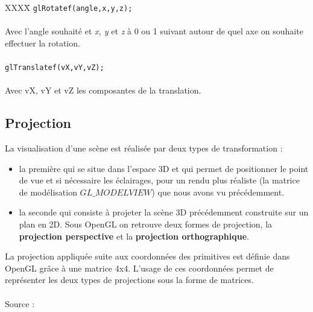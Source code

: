 \begin{tabbing}
XXXX\= \kill
\> \verb|glRotatef(angle,x,y,z);| \\\\
Avec l'angle souhaité et \textit{x, y} et \textit{z} à 0 ou 1 suivant autour de quel axe on souhaite\\ effectuer la rotation.\\\\
\> \verb|glTranslatef(vX,vY,vZ);|\\\\
Avec vX, vY et vZ les composantes de la translation. 
\end{tabbing}

\subsection{Projection}

La visualisation d'une scène est réalisée par deux types de transformation :

\begin{itemize}
	\item la première qui se situe dans l'espace 3D et qui permet de positionner le point de vue et si nécessaire les éclairages, pour un rendu plus réaliste (la matrice de modélisation $GL\_MODELVIEW$) que nous avons vu précédemment.

	\item la seconde qui consiste à projeter la scène 3D précédemment construite sur un plan en 2D. Sous OpenGL on retrouve deux formes de projection, la \textbf{projection perspective} et la \textbf{projection orthographique}.
\end{itemize}

La projection appliquée suite aux coordonnées des primitives est définie dans OpenGL grâce à une matrice 4x4. L'usage de ces coordonnées permet de représenter les deux types de projections sous la forme de matrices. \\\\
Source : \cite{PdfOpenGL}


